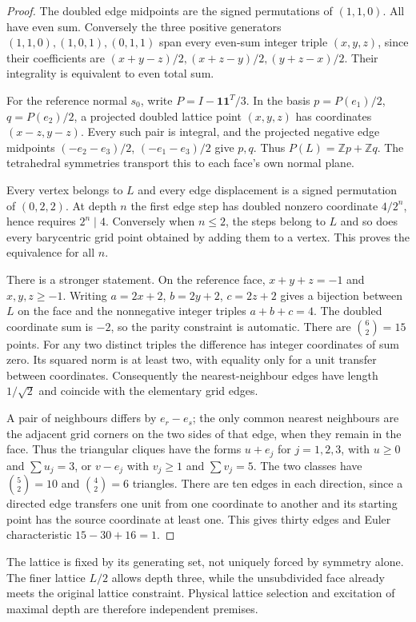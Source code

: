 \documentclass[10pt,a4paper,twocolumn]{article}
\newcommand{\Z}{\mathbb Z}
\begin{document}
\begin{proof}
The doubled edge midpoints are the signed permutations of $(1,1,0)$. All have even sum. Conversely the three positive generators $(1,1,0),(1,0,1),(0,1,1)$ span every even-sum integer triple $(x,y,z)$, since their coefficients are $(x+y-z)/2,(x+z-y)/2,(y+z-x)/2$. Their integrality is equivalent to even total sum.

For the reference normal $s_0$, write $P=I-\mathbf1\mathbf1^T/3$. In the basis $p=P(e_1)/2$, $q=P(e_2)/2$, a projected doubled lattice point $(x,y,z)$ has coordinates $(x-z,y-z)$. Every such pair is integral, and the projected negative edge midpoints $(-e_2-e_3)/2$, $(-e_1-e_3)/2$ give $p,q$. Thus $P(L)=\Z p+\Z q$. The tetrahedral symmetries transport this to each face's own normal plane.

Every vertex belongs to $L$ and every edge displacement is a signed permutation of $(0,2,2)$. At depth $n$ the first edge step has doubled nonzero coordinate $4/2^n$, hence requires $2^n\mid4$. Conversely when $n\le2$, the steps belong to $L$ and so does every barycentric grid point obtained by adding them to a vertex. This proves the equivalence for all $n$.

There is a stronger statement. On the reference face, $x+y+z=-1$ and $x,y,z\ge-1$. Writing $a=2x+2$, $b=2y+2$, $c=2z+2$ gives a bijection between $L$ on the face and the nonnegative integer triples $a+b+c=4$. The doubled coordinate sum is $-2$, so the parity constraint is automatic. There are $\binom62=15$ points. For any two distinct triples the difference has integer coordinates of sum zero. Its squared norm is at least two, with equality only for a unit transfer between coordinates. Consequently the nearest-neighbour edges have length $1/\sqrt2$ and coincide with the elementary grid edges.

A pair of neighbours differs by $e_r-e_s$; the only common nearest neighbours are the adjacent grid corners on the two sides of that edge, when they remain in the face. Thus the triangular cliques have the forms $u+e_j$ for $j=1,2,3$, with $u\ge0$ and $\sum u_j=3$, or $v-e_j$ with $v_j\ge1$ and $\sum v_j=5$. The two classes have $\binom52=10$ and $\binom42=6$ triangles. There are ten edges in each direction, since a directed edge transfers one unit from one coordinate to another and its starting point has the source coordinate at least one. This gives thirty edges and Euler characteristic $15-30+16=1$.
\end{proof}
The lattice is fixed by its generating set, not uniquely forced by symmetry alone. The finer lattice $L/2$ allows depth three, while the unsubdivided face already meets the original lattice constraint. Physical lattice selection and excitation of maximal depth are therefore independent premises.
\end{document}
